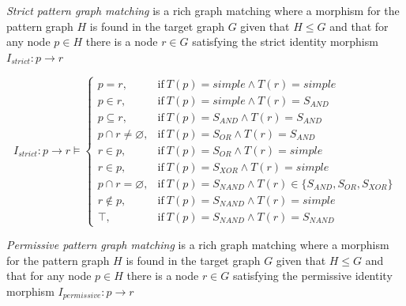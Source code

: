 \begin{definition}\label{def:strict-matching}
	\textit{Strict pattern graph matching} is a rich graph matching where a morphism for the pattern graph $H$ is found in the target graph $G$ given that $H \leq G$ and that for any node $p \in H$ there is a node $r \in G$ satisfying the strict identity morphism $I_{strict}:p \rightarrow r$
\end{definition}


\begin{equation} \label{eq:strict}
	I_{strict}:p \rightarrow r \models
	\begin{cases}
	p = r, & \text{if}\ T(p) = simple \wedge T(r) = simple \\
	p \in r, & \text{if}\ T(p) = simple \wedge T(r) = S_{AND} \\
	p \subseteq r, & \text{if}\ T(p) = S_{AND} \wedge T(r)= S_{AND} \\
	p \cap r \neq \varnothing, & \text{if}\ T(p) = S_{OR} \wedge T(r) = S_{AND}\\
	r \in p, & \text{if}\ T(p) = S_{OR} \wedge T(r) = simple \\
	r \in p, & \text{if}\ T(p) = S_{XOR} \wedge T(r) = simple \\
	p \cap r = \varnothing, & \text{if}\ T(p) = S_{NAND} \wedge T(r) \in \{S_{AND}, S_{OR}, S_{XOR}\} \\
	r \notin p, & \text{if}\ T(p) = S_{NAND} \wedge T(r) = simple \\
	\top, & \text{if}\ T(p) = S_{NAND} \wedge T(r) = S_{NAND}
	\end{cases}
\end{equation}

\begin{definition}\label{def:permissive-matching}
	\textit{Permissive pattern graph matching} is a rich graph matching where a morphism for the pattern graph $H$ is found in the target graph $G$ given that $H \leq G$ and that for any node $p \in H$ there is a node $r \in G$ satisfying the permissive identity morphism $I_{permissive}:p \rightarrow r$
\end{definition}

